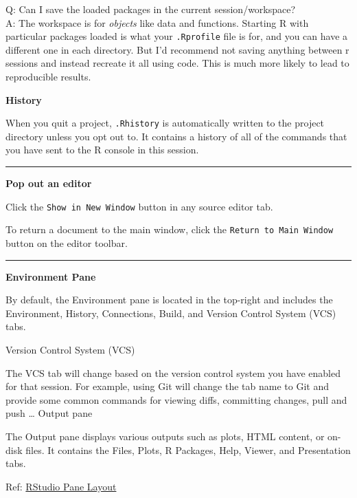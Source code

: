 \documentclass[
]{book}
\theoremstyle{definition}
\theoremstyle{definition}
\theoremstyle{definition}
\theoremstyle{definition}
\theoremstyle{remark}
\begin{document}
Q: Can I save the loaded packages in the current session/workspace?\\
A: The workspace is for \emph{objects} like data and functions. Starting R with particular packages loaded is what your \texttt{.Rprofile} file is for, and you can have a different one in each directory. But I'd recommend not saving anything between r sessions and instead recreate it all using code. This is much more likely to lead to reproducible results.

\textbf{History}

When you quit a project, \texttt{.Rhistory} is automatically written to the project directory unless you opt out to. It contains a history of all of the commands that you have sent to the R console in this session.

\begin{center}\rule{0.5\linewidth}{0.5pt}\end{center}

\textbf{Pop out an editor}

Click the \texttt{Show\ in\ New\ Window} button in any source editor tab.

To return a document to the main window, click the \texttt{Return\ to\ Main\ Window} button on the editor toolbar.

\begin{center}\rule{0.5\linewidth}{0.5pt}\end{center}

\textbf{Environment Pane}

By default, the Environment pane is located in the top-right and includes the Environment, History, Connections, Build, and Version Control System (VCS) tabs.

Version Control System (VCS)

The VCS tab will change based on the version control system you have enabled for that session. For example, using Git will change the tab name to Git and provide some common commands for viewing diffs, committing changes, pull and push \ldots{}
Output pane

The Output pane displays various outputs such as plots, HTML content, or on-disk files. It contains the Files, Plots, R Packages, Help, Viewer, and Presentation tabs.

Ref: \href{https://docs.posit.co/ide/user/ide/guide/ui/ui-panes.html\#:~:text=four\%20primary\%20panes.-,To\%20add\%20additional\%20source\%20columns\%2C\%20from\%20the\%20RStudio\%20menu\%3A\%20Global,only\%20within\%20the\%20Source\%20pane.}{RStudio Pane Layout}
\end{document}

